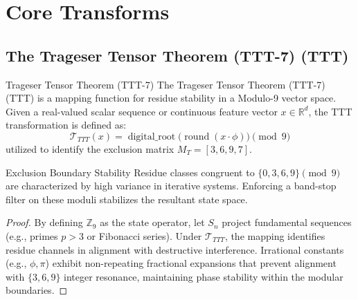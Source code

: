 \section{Core Transforms}

\subsection{The Trageser Tensor Theorem (TTT-7) (TTT)}

\begin{definition}{Trageser Tensor Theorem (TTT-7)}{}
	The Trageser Tensor Theorem (TTT-7) (TTT) is a mapping function for residue stability in a Modulo-9 vector space. Given a real-valued scalar sequence or continuous feature vector $x \in \mathbb{R}^d$, the TTT transformation is defined as:
	\[
	\mathcal{T}_{TTT}(x) = \operatorname{digital\_root}\bigl( \operatorname{round}(x \cdot \phi) \bigr) \pmod{9}
	\]
	utilized to identify the exclusion matrix $M_T = [3, 6, 9, 7]$.
\end{definition}

\begin{proposition}{Exclusion Boundary Stability}{}
	Residue classes congruent to $\{0, 3, 6, 9\} \pmod 9$ are characterized by high variance in iterative systems. Enforcing a band-stop filter on these moduli stabilizes the resultant state space.
\end{proposition}

\begin{proof}
	By defining $\mathbb{Z}_9$ as the state operator, let $S_n$ project fundamental sequences (e.g., primes $p>3$ or Fibonacci series). Under $\mathcal{T}_{TTT}$, the mapping identifies residue channels in alignment with destructive interference. Irrational constants (e.g., $\phi, \pi$) exhibit non-repeating fractional expansions that prevent alignment with $\{3, 6, 9\}$ integer resonance, maintaining phase stability within the modular boundaries.
\end{proof}

